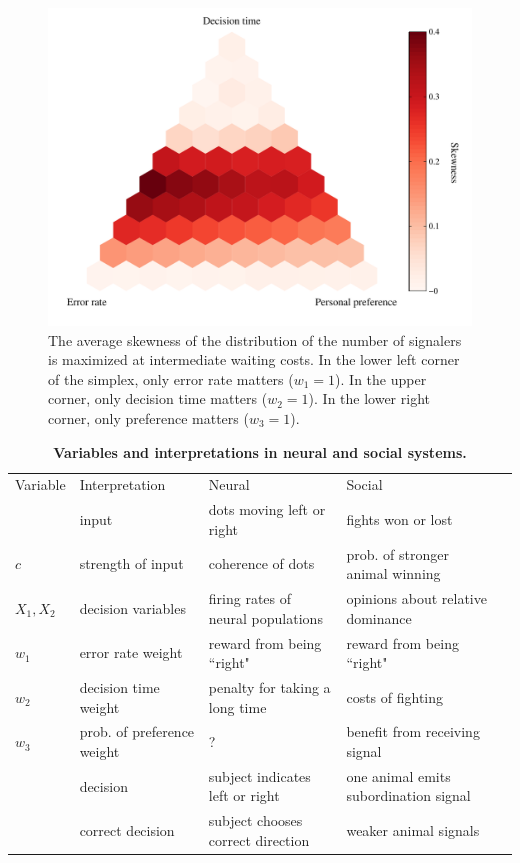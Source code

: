 \documentclass{article}
\newcommand{\ra}[1]{\renewcommand{\arraystretch}{#1}}
\begin{document}
\begin{figure}[ht]
\includegraphics[width=\textwidth]{skewness_heatmap.pdf}
\caption{\label{skewness} The average skewness of the distribution of the number of signalers is maximized at intermediate waiting costs. In the lower left corner of the simplex, only error rate matters ($w_1=1$).  In the upper corner, only decision time matters ($w_2=1$).  In the lower right corner, only preference matters ($w_3=1$).}
\end{figure}


\begin{table}[ht]
\centering
\caption{\label{variables}{\bf  Variables and interpretations in neural and social systems.} }
\ra{1.3}
\begin{tabular}{@{}lllll@{}}
Variable & Interpretation & Neural &   Social \\
\cmidrule{1-4} 
& input & dots moving left or right & fights won or lost
\\$c$ & strength of input & coherence of dots & prob. of stronger animal winning
\\$X_1,X_2$ & decision variables &  firing rates of neural populations & opinions about relative dominance
\\ $w_1$ & error rate weight & reward from being ``right" & reward from being ``right"
\\ $w_2$ & decision time weight & penalty for taking a long time & costs of fighting
\\ $w_3$ & prob. of preference weight & ? & benefit from receiving signal
\\ & decision & subject indicates left or right & one animal emits subordination signal
\\ & correct decision & subject chooses correct direction & weaker animal signals
\end{tabular}
\end{table}
\end{document}
